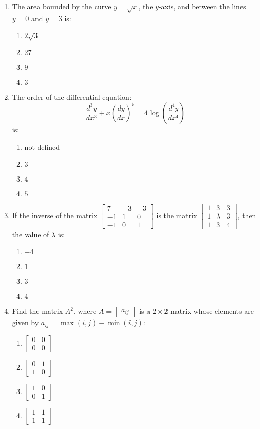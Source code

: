 \documentclass{article}
\providecommand{\myvec}[1]{\ensuremath{\begin{bmatrix}#1\end{bmatrix}}}
\begin{document}
\begin{enumerate}
    \item The area bounded by the curve $y = \sqrt{x}$, the $y$-axis, and between the lines $y = 0$ and $y = 3$ is:
    \begin{enumerate}[label=(\alph*)]
        \item $2\sqrt{3}$
        \item $27$
        \item $9$
        \item $3$
    \end{enumerate}

    \item The order of the differential equation:
    $$
    \frac{d^3 y}{dx^3} + x \left( \frac{dy}{dx} \right)^5 = 4 \log \left( \frac{d^4 y}{dx^4} \right)
    $$
    is:
    \begin{enumerate}[label=(\alph*)]
        \item not defined
        \item $3$
        \item $4$
        \item $5$
    \end{enumerate}
    \item If the inverse of the matrix $\myvec{7 & -3 & -3 \\ -1 & 1 & 0 \\ -1 & 0 & 1}$ is the matrix $\myvec{1 & 3 & 3 \\ 1 & \lambda & 3 \\ 1 & 3 & 4}$, then the value of $\lambda$ is:
   \begin{enumerate}[label=(\alph*)]
    \item $-4$
    \item $1$
    \item $3$
    \item $4$
 \end{enumerate}
     \item Find the matrix $A^2$, where $A = \myvec{a_{ij}}$ is a $2 \times 2$ matrix whose elements are given by $a_{ij} = \max(i, j) - \min(i, j)$:
\begin{enumerate}[label=(\alph*)]
    \item $\myvec{0 & 0 \\ 0 & 0}$
    \item $\myvec{0 & 1 \\ 1 & 0}$
    \item $\myvec{1 & 0 \\ 0 & 1}$
    \item $\myvec{1 & 1 \\ 1 & 1}$

\end{enumerate}
\end{enumerate}
\end{document}
